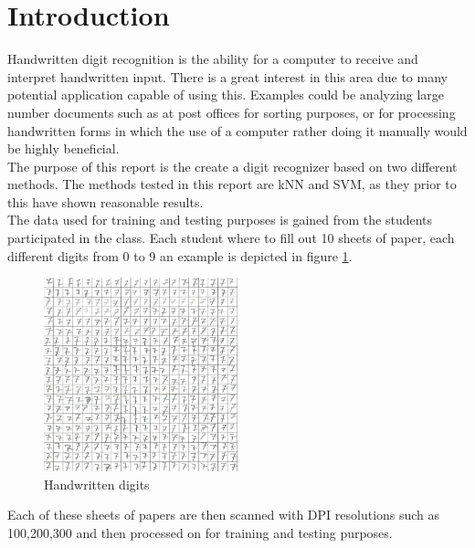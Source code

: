 \section{Introduction}
Handwritten digit recognition is the ability for a computer to receive and interpret handwritten input. There is a great interest in this area due to many potential application capable of using this. Examples could be analyzing large number documents such as at post offices for sorting purposes, or for processing handwritten forms in which the use of a computer rather doing it manually would be highly beneficial.  \\

The purpose of this report is the create a digit recognizer based on two different methods.  The methods tested in this report are kNN and SVM, as they prior to this have shown reasonable results.\\

The data used for training and testing purposes is gained from the students participated in the class.  Each student where to fill out 10 sheets of paper, each different digits from 0 to 9 an example is depicted in figure \ref{fig:handwriten_digits}. 

\begin{figure}[H]
\centering
\includegraphics[width = 0.5\textwidth]{img/cropY2016G2M1-100-7.png}
\caption{Handwritten digits}
\label{fig:handwriten_digits}
\end{figure}

Each of these sheets of papers are then scanned with DPI resolutions such as 100,200,300 and then processed on for training and testing purposes. 
\newpage